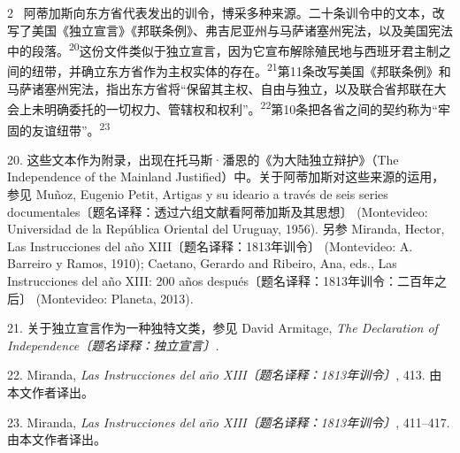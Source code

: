 \documentclass[10pt,a4paper]{article}
\begin{document}
\begin{paracol}{2}
\switchcolumn*
{\scriptsize\color{gray} [p. 6]}\ 阿蒂加斯向东方省代表发出的训令，博采多种来源。二十条训令中的文本，改写了美国《独立宣言》《邦联条例》、弗吉尼亚州与马萨诸塞州宪法，以及美国宪法中的段\mbox{落。\textsuperscript{20}}这份文件类似于独立宣言，因为它宣布解除殖民地与西班牙君主制之间的纽带，并确立东方省作为主权实体的存\mbox{在。\textsuperscript{21}}第11条改写美国《邦联条例》和马萨诸塞州宪法，指出东方省将“保留其主权、自由与独立，以及联合省邦联在大会上未明确委托的一切权力、管辖权和权利”。\nobreak\textsuperscript{22}第10条把各省之间的契约称为“牢固的友谊纽带”。\nobreak\textsuperscript{23}\par{\small 20. 这些文本作为附录，出现在托马斯·潘恩的《为大陆独立辩护》（The Independence of the Mainland Justified）中。关于阿蒂加斯对这些来源的运用，参见 Muñoz, Eugenio Petit, Artigas y su ideario a través de seis series documentales〔题名译释：透过六组文献看阿蒂加斯及其思想〕 (Montevideo: Universidad de la República Oriental del Uruguay, 1956). 另参 Miranda, Hector, Las Instrucciones del año XIII〔题名译释：1813年训令〕 (Montevideo: A. Barreiro y Ramos, 1910); Caetano, Gerardo and Ribeiro, Ana, eds., Las Instrucciones del año XIII: 200 años después〔题名译释：1813年训令：二百年之后〕 (Montevideo: Planeta, 2013).\par}{\small 21. 关于独立宣言作为一种独特文类，参见 David Armitage, \textit{The Declaration of Independence〔题名译释：独立宣言〕.}\par}{\small 22. Miranda, \textit{Las Instrucciones del año XIII〔题名译释：1813年训令〕}, 413. 由本文作者译出。\par}{\small 23. Miranda, \textit{Las Instrucciones del año XIII〔题名译释：1813年训令〕}, 411–417. 由本文作者译出。\par}
\switchcolumn

\end{paracol}
\end{document}
